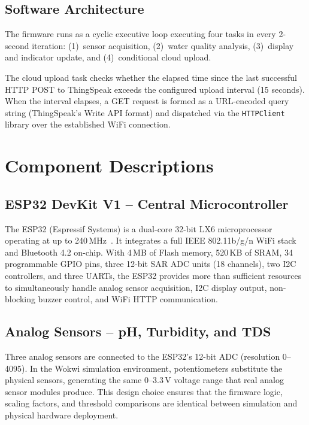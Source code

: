\documentclass[12pt,a4paper]{article}
\begin{document}
\subsection{Software Architecture}

The firmware runs as a cyclic executive loop executing four
tasks in every 2-second iteration: (1)~sensor acquisition,
(2)~water quality analysis, (3)~display and indicator update,
and (4)~conditional cloud upload.

The cloud upload task checks whether the elapsed time since
the last successful HTTP POST to ThingSpeak exceeds the
configured upload interval (15 seconds). When the interval
elapses, a GET request is formed as a URL-encoded query string
(ThingSpeak's Write API format) and dispatched via the
\texttt{HTTPClient} library over the established WiFi connection.

\section{Component Descriptions}
\label{sec:components}

\subsection{ESP32 DevKit V1 -- Central Microcontroller}

The ESP32 (Espressif Systems) is a dual-core 32-bit LX6
microprocessor operating at up to 240\,MHz~\cite{esp32ds2023}.
It integrates a full IEEE 802.11b/g/n WiFi stack and
Bluetooth 4.2 on-chip. With 4\,MB of Flash memory, 520\,KB of
SRAM, 34 programmable GPIO pins, three 12-bit SAR ADC units
(18 channels), two I2C controllers, and three UARTs, the ESP32
provides more than sufficient resources to simultaneously handle
analog sensor acquisition, I2C display output, non-blocking buzzer
control, and WiFi HTTP communication.

\subsection{Analog Sensors -- pH, Turbidity, and TDS}

Three analog sensors are connected to the ESP32's 12-bit ADC
(resolution 0--4095). In the Wokwi simulation environment,
potentiometers substitute the physical sensors, generating the
same 0--3.3\,V voltage range that real analog sensor modules
produce. This design choice ensures that the firmware logic,
scaling factors, and threshold comparisons are identical between
simulation and physical hardware deployment.
\end{document}

